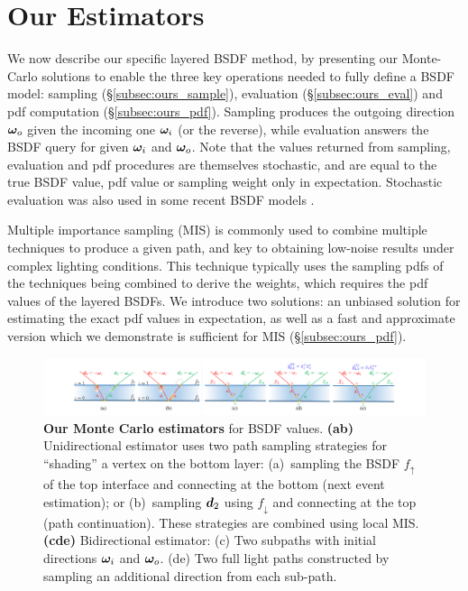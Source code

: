 \section{Our Estimators}
\label{sec:ours}
%
We now describe our specific layered BSDF method,
by presenting our Monte-Carlo solutions to enable the three key operations needed to fully define a BSDF model:
sampling (\S\ref{subsec:ours_sample}), evaluation (\S\ref{subsec:ours_eval}) and pdf computation (\S\ref{subsec:ours_pdf}).
Sampling produces the outgoing direction $\bm{\omega}_o$ given the incoming one $\bm{\omega}_i$ (or the reverse), while evaluation answers the BSDF query for given $\bm{\omega}_i$ and $\bm{\omega}_o$. Note that the values returned from sampling, evaluation and pdf procedures are themselves stochastic, and are equal to the true BSDF value, pdf value or sampling weight only in expectation. Stochastic evaluation was also used in some recent BSDF models \cite{Heitz:2016:MMB}. 

Multiple importance sampling (MIS) is commonly used to combine multiple techniques to produce a given path, and key to obtaining low-noise results under complex lighting conditions. This technique typically uses the sampling pdfs of the techniques being combined to derive the weights, which requires the pdf values of the layered BSDFs. We introduce two solutions: an unbiased solution for estimating the exact pdf values in expectation, as well as a fast and approximate version which we demonstrate is sufficient for MIS (\S\ref{subsec:ours_pdf}). 

\begin{figure}[t]
	\centering
    \includegraphics[width=\textwidth]{images/illustration/unidir-bidir.pdf}
	\caption{
		\label{fig:estimators}
		\textbf{Our Monte Carlo estimators} for BSDF values.
		\textbf{(ab)} Unidirectional estimator uses two path sampling strategies for ``shading'' a vertex on the bottom layer:
		(a)~sampling the BSDF $f_\uparrow$ of the top interface and connecting at the bottom (next event estimation); or (b)~sampling $\bm{d}_2$ using $f_\downarrow$ and connecting at the top (path continuation). These strategies are combined using local MIS. \textbf{(cde)} Bidirectional estimator: (c) Two subpaths with initial directions $\bm{\omega}_i$ and $\bm{\omega}_o$. (de) Two full light paths constructed by sampling an additional direction from each sub-path.
	}
\end{figure}

